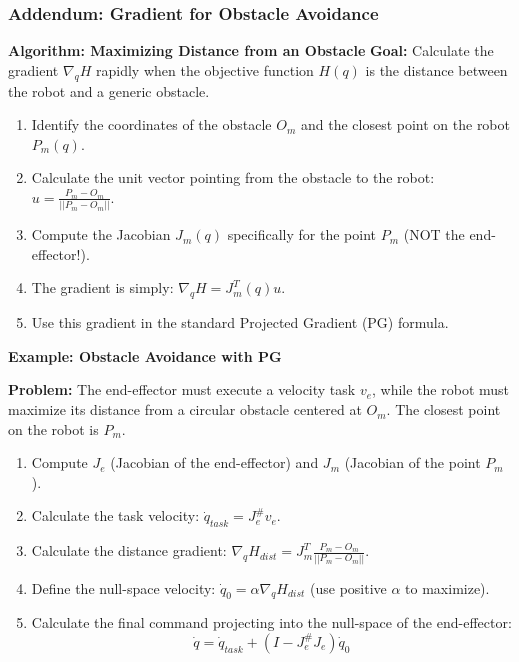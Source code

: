 \documentclass[11pt,a4paper]{article}
\begin{document}
\subsubsection{Addendum: Gradient for Obstacle Avoidance}
 \textbf{Algorithm: Maximizing Distance from an Obstacle}
\textbf{Goal:} Calculate the gradient $\nabla_q H$ rapidly when the objective function $H(q)$ is the distance between the robot and a generic obstacle.
\begin{enumerate}
    \item Identify the coordinates of the obstacle $O_m$ and the closest point on the robot $P_m(q)$.
    \item Calculate the unit vector pointing from the obstacle to the robot: $u = \frac{P_m - O_m}{||P_m - O_m||}$.
    \item Compute the Jacobian $J_m(q)$ specifically for the point $P_m$ (NOT the end-effector!).
    \item The gradient is simply: $\nabla_q H = J_m^T(q) u$.
    \item Use this gradient in the standard Projected Gradient (PG) formula.
\end{enumerate}

\vspace{0.3cm}
\noindent \textbf{\large Example: Obstacle Avoidance with PG}
\vspace{0.1cm}

\noindent \textbf{Problem:} The end-effector must execute a velocity task $v_e$, while the robot must maximize its distance from a circular obstacle centered at $O_m$. The closest point on the robot is $P_m$.
\begin{enumerate}
    \item Compute $J_e$ (Jacobian of the end-effector) and $J_m$ (Jacobian of the point $P_m$).
    \item Calculate the task velocity: $\dot{q}_{task} = J_e^\# v_e$.
    \item Calculate the distance gradient: $\nabla_q H_{dist} = J_m^T \frac{P_m - O_m}{||P_m - O_m||}$.
    \item Define the null-space velocity: $\dot{q}_0 = \alpha \nabla_q H_{dist}$ (use positive $\alpha$ to maximize).
    \item Calculate the final command projecting into the null-space of the end-effector:
    $$\dot{q} = \dot{q}_{task} + (I - J_e^\# J_e)\dot{q}_0$$
\end{enumerate}

\end{document}
